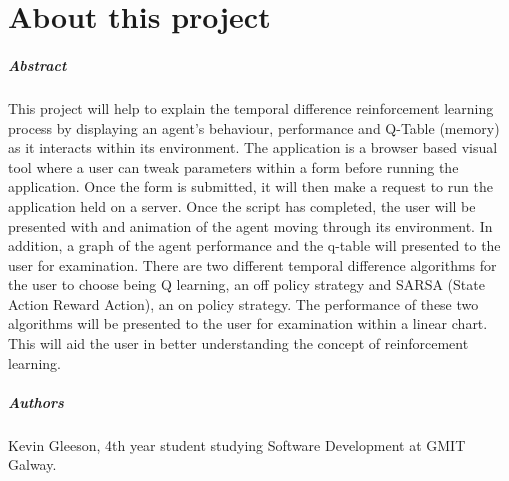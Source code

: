 
\chapter*{About this project}
\paragraph{Abstract}

This project will help to explain the temporal difference reinforcement learning process by displaying an agent's behaviour, performance and Q-Table (memory) as it interacts within its environment. The application is a browser based visual tool where a user can tweak parameters within a form before running the application. Once the form is submitted, it will then make a request to run the application held on a server. Once the script has completed, the user will be presented with and animation of the agent moving through its environment. In addition, a graph of the agent performance and the q-table will presented to the user for examination. There are two different temporal difference algorithms for the user to choose being Q learning, an off policy strategy and SARSA (State Action Reward Action), an on policy strategy. The performance of these two algorithms will be presented to the user for examination within a linear chart.
This will aid the user in better understanding the concept of reinforcement learning.

\paragraph{Authors}
Kevin Gleeson, 4th year student studying Software Development at GMIT Galway.



